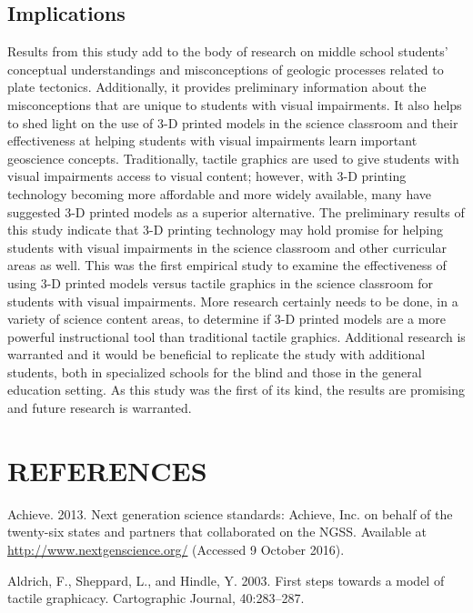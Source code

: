\documentclass[11.5pt]{sig-alternate} %
\begin{document}
\begin{large}
\subsection*{Implications}

Results from this study add to the body of research on middle school students’ conceptual understandings and misconceptions of geologic processes related to plate tectonics.  Additionally, it provides preliminary information about the misconceptions that are unique to students with visual impairments.  It also helps to shed light on the use of 3-D printed models in the science classroom and their effectiveness at helping students with visual impairments learn important geoscience concepts.  Traditionally, tactile graphics are used to give students with visual impairments access to visual content; however, with 3-D printing technology becoming more affordable and more widely available, many have suggested 3-D printed models as a superior alternative.  The preliminary results of this study indicate that 3-D printing technology may hold promise for helping students with visual impairments in the science classroom and other curricular areas as well.  This was the first empirical study to examine the effectiveness of using 3-D printed models versus tactile graphics in the science classroom for students with visual impairments.  More research certainly needs to be done, in a variety of science content areas, to determine if 3-D printed models are a more powerful instructional tool than traditional tactile graphics.  Additional research is warranted and it would be beneficial to replicate the study with additional students, both in specialized schools for the blind and those in the general education setting.  As this study was the first of its kind, the results are promising and future research is warranted.    

\end{large}
\clearpage

\section*{REFERENCES}\par 
\leftskip 0.25in
\parindent -0.25in 

Achieve. 2013. Next generation science standards: Achieve, Inc. on behalf of the twenty-six states and partners that collaborated on the NGSS. Available at \url{http://www.nextgenscience.org/} (Accessed 9 October 2016).

Aldrich, F., Sheppard, L., and Hindle, Y. 2003. First steps towards a model of tactile graphicacy. Cartographic Journal, 40:283–287.
\end{document}
